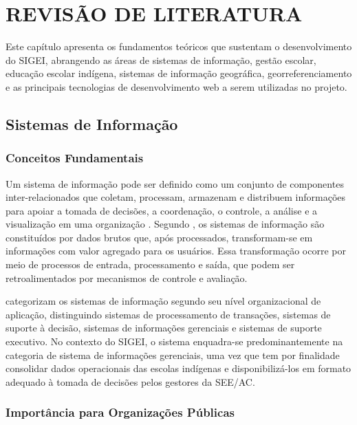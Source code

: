 \documentclass[12pt,a4paper,oneside]{abntspiifac}
\begin{document}

\chapter{REVISÃO DE LITERATURA}
\label{cap:revisao}

Este capítulo apresenta os fundamentos teóricos que sustentam o desenvolvimento do SIGEI, abrangendo as áreas de sistemas de informação, gestão escolar, educação escolar indígena, sistemas de informação geográfica, georreferenciamento e as principais tecnologias de desenvolvimento web a serem utilizadas no projeto.

\section{Sistemas de Informação}

\subsection{Conceitos Fundamentais}

Um sistema de informação pode ser definido como um conjunto de componentes inter-relacionados que coletam, processam, armazenam e distribuem informações para apoiar a tomada de decisões, a coordenação, o controle, a análise e a visualização em uma organização \cite{laudon2014}. Segundo , os sistemas de informação são constituídos por dados brutos que, após processados, transformam-se em informações com valor agregado para os usuários. Essa transformação ocorre por meio de processos de entrada, processamento e saída, que podem ser retroalimentados por mecanismos de controle e avaliação.

 categorizam os sistemas de informação segundo seu nível organizacional de aplicação, distinguindo sistemas de processamento de transações, sistemas de suporte à decisão, sistemas de informações gerenciais e sistemas de suporte executivo. No contexto do SIGEI, o sistema enquadra-se predominantemente na categoria de sistema de informações gerenciais, uma vez que tem por finalidade consolidar dados operacionais das escolas indígenas e disponibilizá-los em formato adequado à tomada de decisões pelos gestores da SEE/AC.

\subsection{Importância para Organizações Públicas}
\end{document}
